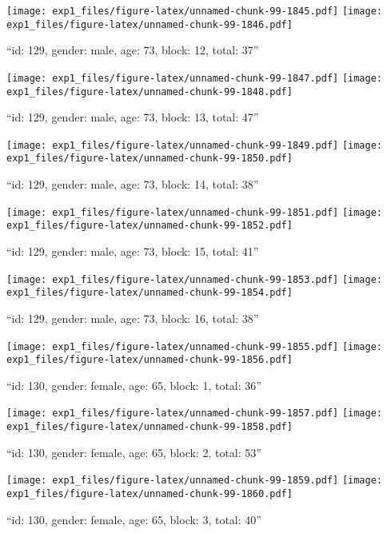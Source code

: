 \documentclass[,]{article}
\begin{document}
\texttt{[image: exp1\_files/figure-latex/unnamed-chunk-99-1845.pdf]}
\texttt{[image: exp1\_files/figure-latex/unnamed-chunk-99-1846.pdf]}

\newpage
[1] 

``id: 129, gender: male, age: 73, block: 12, total: 37''

\texttt{[image: exp1\_files/figure-latex/unnamed-chunk-99-1847.pdf]}
\texttt{[image: exp1\_files/figure-latex/unnamed-chunk-99-1848.pdf]}

\newpage
[1] 

``id: 129, gender: male, age: 73, block: 13, total: 47''

\texttt{[image: exp1\_files/figure-latex/unnamed-chunk-99-1849.pdf]}
\texttt{[image: exp1\_files/figure-latex/unnamed-chunk-99-1850.pdf]}

\newpage
[1] 

``id: 129, gender: male, age: 73, block: 14, total: 38''

\texttt{[image: exp1\_files/figure-latex/unnamed-chunk-99-1851.pdf]}
\texttt{[image: exp1\_files/figure-latex/unnamed-chunk-99-1852.pdf]}

\newpage
[1] 

``id: 129, gender: male, age: 73, block: 15, total: 41''

\texttt{[image: exp1\_files/figure-latex/unnamed-chunk-99-1853.pdf]}
\texttt{[image: exp1\_files/figure-latex/unnamed-chunk-99-1854.pdf]}

\newpage
[1] 

``id: 129, gender: male, age: 73, block: 16, total: 38''

\texttt{[image: exp1\_files/figure-latex/unnamed-chunk-99-1855.pdf]}
\texttt{[image: exp1\_files/figure-latex/unnamed-chunk-99-1856.pdf]}

\newpage
[1] 

``id: 130, gender: female, age: 65, block: 1, total: 36''

\texttt{[image: exp1\_files/figure-latex/unnamed-chunk-99-1857.pdf]}
\texttt{[image: exp1\_files/figure-latex/unnamed-chunk-99-1858.pdf]}

\newpage
[1] 

``id: 130, gender: female, age: 65, block: 2, total: 53''

\texttt{[image: exp1\_files/figure-latex/unnamed-chunk-99-1859.pdf]}
\texttt{[image: exp1\_files/figure-latex/unnamed-chunk-99-1860.pdf]}

\newpage
[1] 

``id: 130, gender: female, age: 65, block: 3, total: 40''
\end{document}

